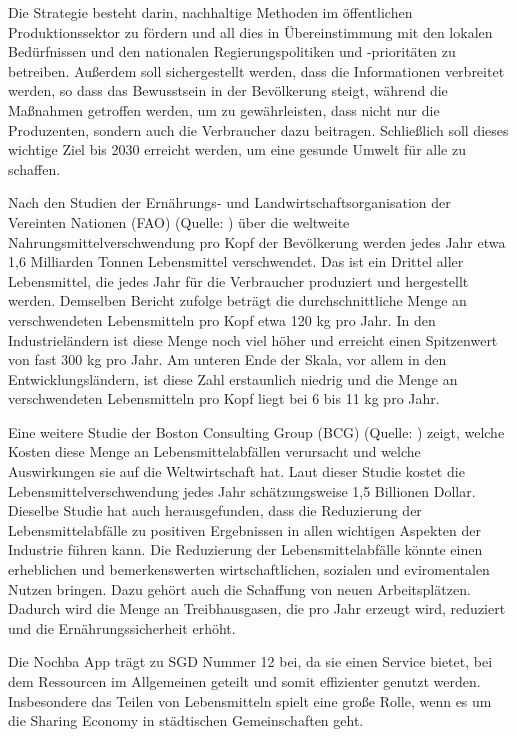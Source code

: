 Die Strategie besteht darin, nachhaltige Methoden im öffentlichen Produktionssektor zu fördern und all dies in Übereinstimmung mit den lokalen Bedürfnissen und den nationalen Regierungspolitiken und -prioritäten zu betreiben. Außerdem soll sichergestellt werden, dass die Informationen verbreitet werden, so dass das Bewusstsein in der Bevölkerung steigt, während die Maßnahmen getroffen werden, um zu gewährleisten, dass nicht nur die Produzenten, sondern auch die Verbraucher dazu beitragen. Schließlich soll dieses wichtige Ziel bis 2030 erreicht werden, um eine gesunde Umwelt für alle zu schaffen. 

Nach den Studien der Ernährungs- und Landwirtschaftsorganisation der Vereinten Nationen (FAO) (Quelle: \cite{bcg2018foodloss} ) über die weltweite Nahrungsmittelverschwendung pro Kopf der Bevölkerung werden jedes Jahr etwa 1,6 Milliarden Tonnen Lebensmittel verschwendet. Das ist ein Drittel aller Lebensmittel, die jedes Jahr für die Verbraucher produziert und hergestellt werden. Demselben Bericht zufolge beträgt die durchschnittliche Menge an verschwendeten Lebensmitteln pro Kopf etwa 120 kg pro Jahr. In den Industrieländern ist diese Menge noch viel höher und erreicht einen Spitzenwert von fast 300 kg pro Jahr. Am unteren Ende der Skala, vor allem in den Entwicklungsländern, ist diese Zahl erstaunlich niedrig und die Menge an verschwendeten Lebensmitteln pro Kopf liegt bei 6 bis 11 kg pro Jahr.

Eine weitere Studie der Boston Consulting Group (BCG) (Quelle: \cite{bcg2022foodwaste} ) zeigt, welche Kosten diese Menge an Lebensmittelabfällen verursacht und welche Auswirkungen sie auf die Weltwirtschaft hat. Laut dieser Studie kostet die Lebensmittelverschwendung jedes Jahr schätzungsweise 1,5 Billionen Dollar. Dieselbe Studie hat auch herausgefunden, dass die Reduzierung der Lebensmittelabfälle zu positiven Ergebnissen in allen wichtigen Aspekten der Industrie führen kann. Die Reduzierung der Lebensmittelabfälle könnte einen erheblichen und bemerkenswerten wirtschaftlichen, sozialen und eviromentalen Nutzen bringen. Dazu gehört auch die Schaffung von neuen Arbeitsplätzen. Dadurch wird die Menge an Treibhausgasen, die pro Jahr erzeugt wird, reduziert und die Ernährungssicherheit erhöht. 

Die Nochba App trägt zu SGD Nummer 12 bei, da sie einen Service bietet, bei dem Ressourcen im Allgemeinen geteilt und somit effizienter genutzt werden. Insbesondere das Teilen von Lebensmitteln spielt eine große Rolle, wenn es um die Sharing Economy in städtischen Gemeinschaften geht. 

